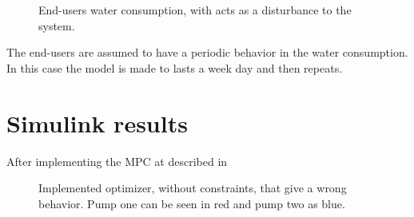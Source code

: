 \begin{figure}[H]
\centering
 
\caption{End-users water consumption, with acts as a disturbance to the system.}
\label{fig:water_consumption}
\end{figure}

The end-users are assumed to have a periodic behavior in the water consumption. In this case the model is made to lasts a week day and then repeats. 


\section{Simulink results}

After implementing the MPC at described in 
\begin{figure}[H]
\centering
 
\caption{Implemented optimizer, without constraints, that give a wrong behavior. Pump one can be seen in red and pump two as blue.}
\label{fig:Implementation_shit}
\end{figure}
